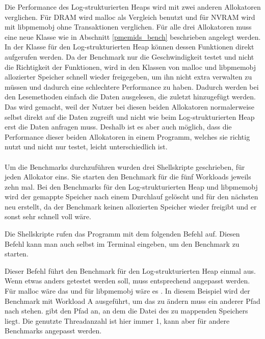\documentclass{class/thesis}
\begin{document}
\begin{thesis}
	Die Performance des Log-strukturierten Heaps wird mit zwei anderen Allokatoren verglichen. Für DRAM wird malloc als Vergleich benutzt und für NVRAM wird mit libpmemobj ohne Transaktionen verglichen.
	Für alle drei Allokatoren muss eine neue Klasse wie in Abschnitt \ref{pmemids_bench} beschrieben angelegt werden.
	In der Klasse für den Log-strukturierten Heap können dessen Funktionen direkt aufgerufen werden.
	Da der Benchmark nur die Geschwindigkeit testet und nicht die Richtigkeit der Funktionen, wird in den Klassen von malloc und libpmemobj allozierter Speicher schnell wieder freigegeben, um ihn nicht extra verwalten zu müssen und dadurch eine schlechtere Performance zu haben. 
	Dadurch werden bei den Lesemethoden einfach die Daten ausgelesen, die zuletzt hinzugefügt werden.
	Das wird gemacht, weil der Nutzer bei diesen beiden Allokatoren normalerweise selbst direkt auf die Daten zugreift und nicht wie beim Log-strukturierten Heap erst die Daten anfragen muss.
	Deshalb ist es aber auch möglich, dass die Performance dieser beiden Allokatoren in einem Programm, welches sie richtig nutzt und nicht nur testet, leicht unterschiedlich ist.
	\\
	\\
	Um die Benchmarks durchzuführen wurden drei Shellskripte geschrieben, für jeden Allokator eins.
	Sie starten den Benchmark für die fünf Workloads jeweils zehn mal. Bei den Benchmarks für den Log-strukturierten Heap und libpmemobj wird der gemappte Speicher nach einem Durchlauf gelöscht und für den nächsten neu erstellt, da der Benchmark keinen allozierten Speicher wieder freigibt und er sonst sehr schnell voll wäre.
	
	Die Shellskripte rufen das Programm mit dem folgenden Befehl auf. Diesen Befehl kann man auch selbst im Terminal eingeben, um den Benchmark zu starten. 
	
	\begin{terminalblock}
	\end{terminalblock}
	
	Dieser Befehl führt den Benchmark für den Log-strukturierten Heap einmal aus. Wenn etwas anders getestet werden soll, muss  entsprechend angepasst werden. Für malloc wäre das  und für libpmemobj wäre es . 
	In diesem Beispiel wird der Benchmark mit Workload A ausgeführt, um das zu ändern muss ein anderer Pfad nach  stehen. 
	 gibt den Pfad an, an dem die Datei des zu mappenden Speichers liegt.
	Die genutzte Threadanzahl ist hier immer 1, kann aber für andere Benchmarks angepasst werden.
	

\end{thesis}
\end{document}
